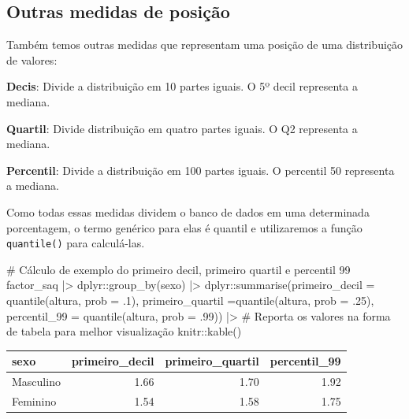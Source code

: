 \documentclass[
  letterpaper,
  DIV=11,
  numbers=noendperiod]{scrartcl}
\newenvironment{Shaded}{\begin{snugshade}}{\end{snugshade}}
\newcommand{\AttributeTok}[1]{\textcolor[rgb]{0.40,0.45,0.13}{#1}}
\newcommand{\CommentTok}[1]{\textcolor[rgb]{0.37,0.37,0.37}{#1}}
\newcommand{\DecValTok}[1]{\textcolor[rgb]{0.68,0.00,0.00}{#1}}
\newcommand{\FunctionTok}[1]{\textcolor[rgb]{0.28,0.35,0.67}{#1}}
\newcommand{\NormalTok}[1]{\textcolor[rgb]{0.00,0.23,0.31}{#1}}
\newcommand{\SpecialCharTok}[1]{\textcolor[rgb]{0.37,0.37,0.37}{#1}}
\begin{document}
\hypertarget{outras-medidas-de-posiuxe7uxe3o}{%
\subsection{Outras medidas de
posição}\label{outras-medidas-de-posiuxe7uxe3o}}

Também temos outras medidas que representam uma posição de uma
distribuição de valores:

\textbf{Decis}: Divide a distribuição em 10 partes iguais. O 5º decil
representa a mediana.

\textbf{Quartil}: Divide distribuição em quatro partes iguais. O Q2
representa a mediana.

\textbf{Percentil}: Divide a distribuição em 100 partes iguais. O
percentil 50 representa a mediana.

Como todas essas medidas dividem o banco de dados em uma determinada
porcentagem, o termo genérico para elas é quantil e utilizaremos a
função \texttt{quantile()} para calculá-las.

\begin{Shaded}
\begin{Highlighting}[]
\CommentTok{\# Cálculo de exemplo do primeiro decil, primeiro quartil e percentil 99}
\NormalTok{factor\_saq }\SpecialCharTok{|\textgreater{}} 
\NormalTok{  dplyr}\SpecialCharTok{::}\FunctionTok{group\_by}\NormalTok{(sexo) }\SpecialCharTok{|\textgreater{}} 
\NormalTok{  dplyr}\SpecialCharTok{::}\FunctionTok{summarise}\NormalTok{(}\AttributeTok{primeiro\_decil =} \FunctionTok{quantile}\NormalTok{(altura, }\AttributeTok{prob =}\NormalTok{ .}\DecValTok{1}\NormalTok{), }\AttributeTok{primeiro\_quartil =}\FunctionTok{quantile}\NormalTok{(altura, }\AttributeTok{prob =}\NormalTok{ .}\DecValTok{25}\NormalTok{), }\AttributeTok{percentil\_99 =} \FunctionTok{quantile}\NormalTok{(altura, }\AttributeTok{prob =}\NormalTok{ .}\DecValTok{99}\NormalTok{))  }\SpecialCharTok{|\textgreater{}} 
  \CommentTok{\# Reporta os valores na forma de tabela para melhor visualização}
\NormalTok{  knitr}\SpecialCharTok{::}\FunctionTok{kable}\NormalTok{()}
\end{Highlighting}
\end{Shaded}

\begin{longtable}[]{@{}lrrr@{}}
\toprule\noalign{}
sexo & primeiro\_decil & primeiro\_quartil & percentil\_99 \\
\midrule\noalign{}
\endhead
\bottomrule\noalign{}
\endlastfoot
Masculino & 1.66 & 1.70 & 1.92 \\
Feminino & 1.54 & 1.58 & 1.75 \\
\end{longtable}
\end{document}

